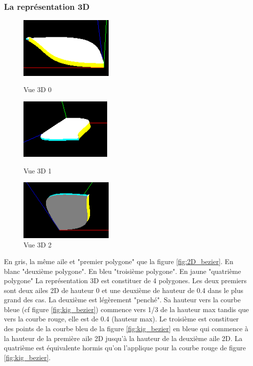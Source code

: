 \documentclass{article}
\begin{document}
\subsubsection{La représentation 3D}

\begin{figure}[!htb]
	\centering
	\begin{minipage}{0.3\textwidth}
    	\centering
    	\includegraphics[height=3cm]{./assets/3D_0_bezier.png}
    	\caption{Vue 3D 0}
    	\label{fig:3D_0_bezier}
	\end{minipage}
	\begin{minipage}{0.3\textwidth}
    	\centering
    	\includegraphics[height=3cm]{./assets/3D_1_bezier.png}
    	\caption{Vue 3D 1}
    	\label{fig:3D_1_bezier}
	\end{minipage}
	\begin{minipage}{0.3\textwidth}
    	\centering
    	\includegraphics[height=3cm]{./assets/3D_2_bezier.png}
    	\caption{Vue 3D 2}
    	\label{fig:3D_2_bezier}
	\end{minipage}
\end{figure}
En gris, la même aile et "premier polygone" que la figure \ref{fig:2D_bezier}. En blanc "deuxième polygone". En bleu "troisième polygone". En jaune "quatrième polygone"
\newline
\newline
La représentation 3D est constituer de 4 polygones. Les deux premiers sont deux ailes 2D de hauteur 0 et une deuxième de hauteur de 0.4 dans le plus grand des cas. La deuxième est légèrement "penché". Sa hauteur vers la courbe bleue (cf figure \ref{fig:kig_bezier}) commence vers 1/3 de la hauteur max tandis que vers la courbe rouge, elle est de 0.4 (hauteur max). Le troisième est constituer des points de la courbe bleu de la figure \ref{fig:kig_bezier} en bleue qui commence à la hauteur de la première aile 2D jusqu'à la hauteur de la deuxième aile 2D. La quatrième est équivalente hormis qu'on l'applique pour la courbe rouge de figure \ref{fig:kig_bezier}.
\end{document}
